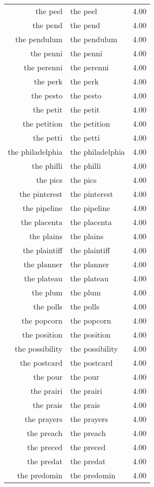 \begin{table}[ht]
\begin{tabular}{rlr}
  the peel & the peel & 4.00 \\ 
  the pend & the pend & 4.00 \\ 
  the pendulum & the pendulum & 4.00 \\ 
  the penni & the penni & 4.00 \\ 
  the perenni & the perenni & 4.00 \\ 
  the perk & the perk & 4.00 \\ 
  the pesto & the pesto & 4.00 \\ 
  the petit & the petit & 4.00 \\ 
  the petition & the petition & 4.00 \\ 
  the petti & the petti & 4.00 \\ 
  the philadelphia & the philadelphia & 4.00 \\ 
  the philli & the philli & 4.00 \\ 
  the pics & the pics & 4.00 \\ 
  the pinterest & the pinterest & 4.00 \\ 
  the pipeline & the pipeline & 4.00 \\ 
  the placenta & the placenta & 4.00 \\ 
  the plains & the plains & 4.00 \\ 
  the plaintiff & the plaintiff & 4.00 \\ 
  the planner & the planner & 4.00 \\ 
  the plateau & the plateau & 4.00 \\ 
  the plum & the plum & 4.00 \\ 
  the polls & the polls & 4.00 \\ 
  the popcorn & the popcorn & 4.00 \\ 
  the position & the position & 4.00 \\ 
  the possibility & the possibility & 4.00 \\ 
  the postcard & the postcard & 4.00 \\ 
  the pour & the pour & 4.00 \\ 
  the prairi & the prairi & 4.00 \\ 
  the prais & the prais & 4.00 \\ 
  the prayers & the prayers & 4.00 \\ 
  the preach & the preach & 4.00 \\ 
  the preced & the preced & 4.00 \\ 
  the predat & the predat & 4.00 \\ 
  the predomin & the predomin & 4.00 \\ 

\end{tabular}
\end{table}
